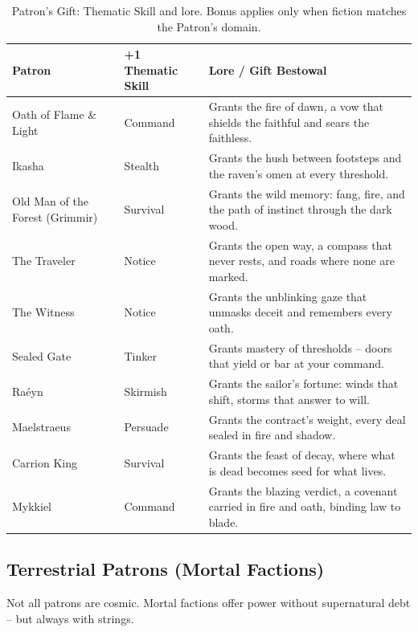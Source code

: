 \begin{table}[h]
\centering
\renewcommand{\arraystretch}{1.1}
\begin{tabular}{|p{4cm}|p{3.5cm}|p{7cm}|}
\hline
\textbf{Patron} & \textbf{+1 Thematic Skill} & \textbf{Lore / Gift Bestowal} \\
\hline
Oath of Flame \& Light & Command & Grants the fire of dawn, a vow that shields the faithful and sears the faithless. \\
\hline
Ikasha & Stealth & Grants the hush between footsteps and the raven's omen at every threshold. \\
\hline
Old Man of the Forest (Grimmir) & Survival & Grants the wild memory: fang, fire, and the path of instinct through the dark wood. \\
\hline
The Traveler & Notice & Grants the open way, a compass that never rests, and roads where none are marked. \\
\hline
The Witness & Notice & Grants the unblinking gaze that unmasks deceit and remembers every oath. \\
\hline
Sealed Gate & Tinker & Grants mastery of thresholds -- doors that yield or bar at your command. \\
\hline
Raéyn & Skirmish & Grants the sailor's fortune: winds that shift, storms that answer to will. \\
\hline
Maelstraeus & Persuade & Grants the contract's weight, every deal sealed in fire and shadow. \\
\hline
Carrion King & Survival & Grants the feast of decay, where what is dead becomes seed for what lives. \\
\hline
Mykkiel & Command & Grants the blazing verdict, a covenant carried in fire and oath, binding law to blade. \\
\hline
\end{tabular}
\caption{Patron's Gift: Thematic Skill and lore. Bonus applies only when fiction matches the Patron's domain.}
\label{tab:patron-gift-srd}
\end{table}

\subsection{Terrestrial Patrons (Mortal Factions)}
Not all patrons are cosmic. Mortal factions offer power without supernatural debt -- but always with strings.

